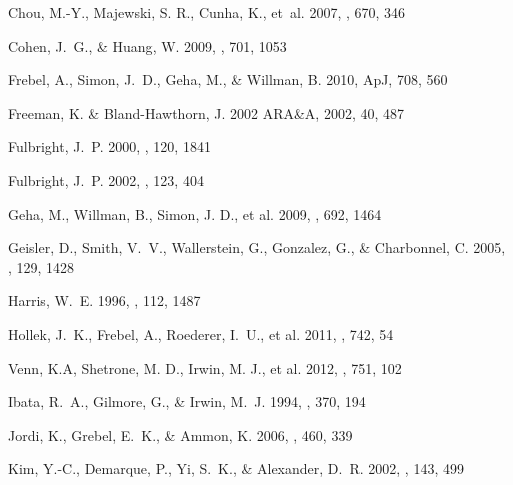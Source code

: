 \documentclass{emulateapj}
\begin{document}
\begin{thebibliography}{40}
{Chou}, M.-Y., {Majewski}, S. R., {Cunha}, K., {et~al.} 2007, \apj, 670, 346

{Cohen}, J.~G., \& {Huang}, W. 2009, \apj, 701, 1053

{Frebel}, A., {Simon}, J.~D., {Geha}, M., \& {Willman}, B. 2010, ApJ, 708, 560

{Freeman}, K. \& {Bland-Hawthorn}, J. 2002 ARA\&A, 2002, 40, 487

{Fulbright}, J.~P. 2000, \aj, 120, 1841

{Fulbright}, J.~P. 2002, \aj, 123, 404

{Geha}, M., {Willman}, B., {Simon}, J. D., {et al.} 2009, \apj, 692, 1464

{Geisler}, D., {Smith}, V.~V., {Wallerstein}, G., {Gonzalez}, G., \&
  {Charbonnel}, C. 2005, \aj, 129, 1428

{Harris}, W.~E. 1996, \aj, 112, 1487

 {Hollek},
  J.~K., {Frebel}, A., {Roederer}, I.~U., {et al.}  2011, \apj, 742, 54

 {Venn}, K.A, Shetrone,
  M. D., Irwin, M. J., {et al.}  2012, \apj, 751, 102

{Ibata}, R.~A., {Gilmore}, G., \& {Irwin}, M.~J. 1994, \nat, 370, 194

{Jordi}, K., {Grebel}, E.~K., \& {Ammon}, K. 2006, \aap, 460, 339

{Kim}, Y.-C., {Demarque}, P., {Yi}, S.~K., \& {Alexander}, D.~R. 2002, \apjs,
  143, 499


\end{thebibliography}
\end{document}
